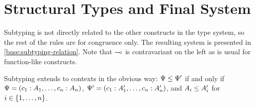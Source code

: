
\section{Structural Types and Final System}

Subtyping is not directly related to the other constructs in the type system, so the rest of the rules are for congruence only. The resulting system is presented in \cref{base:subtyping-relation}. Note that $\multimap$ is contravariant on the left as is usual for function-like constructs.


Subtyping extends to contexts in the obvious way: $\Psi \le \Psi'$ if and only if $\Psi = (c_1 : A_1, \ldots, c_n : A_n)$, $\Psi' = (c_1 : A_1', \ldots, c_n : A_n')$, and $A_i \le A_i'$ for $i \in \lbrace1, \ldots, n\rbrace$.

